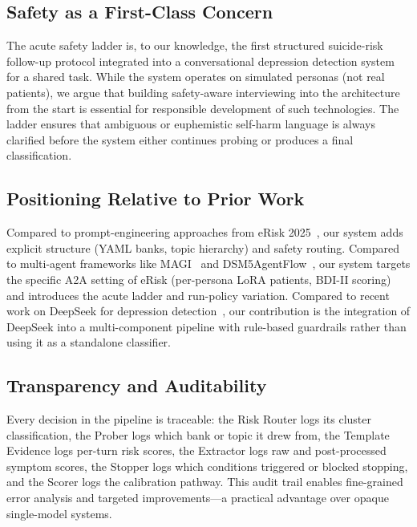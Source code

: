 \documentclass[]{ceurart}
\begin{document}
\subsection{Safety as a First-Class Concern}

The acute safety ladder is, to our knowledge, the first structured suicide-risk follow-up protocol integrated into a conversational depression detection system for a shared task.
While the system operates on simulated personas (not real patients), we argue that building safety-aware interviewing into the architecture from the start is essential for responsible development of such technologies.
The ladder ensures that ambiguous or euphemistic self-harm language is always clarified before the system either continues probing or produces a final classification.

\subsection{Positioning Relative to Prior Work}

Compared to prompt-engineering approaches from eRisk 2025~\cite{DSatGT2025erisk,SINAI2025erisk}, our system adds explicit structure (YAML banks, topic hierarchy) and safety routing.
Compared to multi-agent frameworks like MAGI~\cite{MAGI2025} and DSM5AgentFlow~\cite{DSM5AgentFlow2025}, our system targets the specific A2A setting of eRisk (per-persona LoRA patients, BDI-II scoring) and introduces the acute ladder and run-policy variation.
Compared to recent work on DeepSeek for depression detection~\cite{Leow2025deepseek}, our contribution is the integration of DeepSeek into a multi-component pipeline with rule-based guardrails rather than using it as a standalone classifier.

\subsection{Transparency and Auditability}

Every decision in the pipeline is traceable: the Risk Router logs its cluster classification, the Prober logs which bank or topic it drew from, the Template Evidence logs per-turn risk scores, the Extractor logs raw and post-processed symptom scores, the Stopper logs which conditions triggered or blocked stopping, and the Scorer logs the calibration pathway.
This audit trail enables fine-grained error analysis and targeted improvements---a practical advantage over opaque single-model systems.
\end{document}

